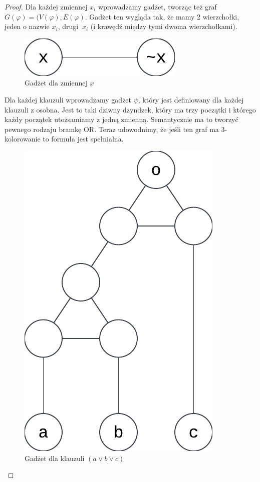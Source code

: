 \begin{proof}
    Dla każdej zmiennej $x_i$ wprowadzamy gadżet, tworząc też graf $G(\varphi) = (V(\varphi), E(\varphi)$. Gadżet ten wygląda tak, że mamy 2 wierzchołki, jeden o nazwie $x_i$, drugi $~x_i$ (i krawędź między tymi dwoma wierzchołkami).
    
    \begin{figure}[H]
        \centering
        \includegraphics{img/3-coloring-variable-gadget.png}
        \caption{Gadżet dla zmiennej \( x \)}
    \end{figure}
    
    Dla każdej klauzuli wprowadzamy gadżet $\psi $, który jest definiowany dla każdej klauzuli z osobna. Jest to taki dziwny dzyndzek, który ma trzy początki i którego każdy początek utożsamiamy z jedną zmienną. Semantycznie ma to tworzyć pewnego rodzaju bramkę OR. Teraz udowodnimy, że jeśli ten graf ma 3-kolorowanie to formuła jest spełnialna. 
    
    \begin{figure}[H]
        \centering
        \includegraphics{img/3-coloring-clause-gadget.png}
        \caption{Gadżet dla klauzuli \((a \lor b \lor c) \)}
    \end{figure}
    

\end{proof}
